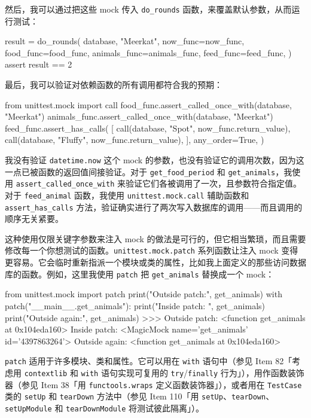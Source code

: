 然后，我可以通过把这些 mock 传入 \texttt{do\_rounds} 函数，来覆盖默认参数，从而运行测试：

\begin{codebox}[python]
result = do_rounds(
    database,
    "Meerkat",
    now_func=now_func,
    food_func=food_func,
    animals_func=animals_func,
    feed_func=feed_func,
)
assert result == 2
\end{codebox}

最后，我可以验证对依赖函数的所有调用都符合我的预期：

\begin{codebox}[python]
from unittest.mock import call
food_func.assert_called_once_with(database, "Meerkat")
animals_func.assert_called_once_with(database, "Meerkat")
feed_func.assert_has_calls(
    [
        call(database, "Spot", now_func.return_value),
        call(database, "Fluffy", now_func.return_value),
    ],
    any_order=True,
)
\end{codebox}

我没有验证 \texttt{datetime.now} 这个 mock 的参数，也没有验证它的调用次数，因为这一点已被函数的返回值间接验证。对于 \texttt{get\_food\_period} 和 \texttt{get\_animals}，我使用 \texttt{assert\_called\_once\_with} 来验证它们各被调用了一次，且参数符合指定值。对于 \texttt{feed\_animal} 函数，我使用 \texttt{unittest.mock.call} 辅助函数和 \texttt{assert\_has\_calls} 方法，验证确实进行了两次写入数据库的调用——而且调用的顺序无关紧要。

这种使用仅限关键字参数来注入 mock 的做法是可行的，但它相当繁琐，而且需要修改每一个你想测试的函数。\texttt{unittest.mock.patch} 系列函数让注入 mock 变得更容易。它会临时重新指派一个模块或类的属性，比如我上面定义的那些访问数据库的函数。例如，这里我使用 \texttt{patch} 把 \texttt{get\_animals} 替换成一个 mock：

\begin{codebox}[python]
from unittest.mock import patch
print("Outside patch:", get_animals)
with patch("__main__.get_animals"):
    print("Inside patch: ", get_animals)
print("Outside again:", get_animals)
>>>
Outside patch: <function get_animals at 0x104eda160>
Inside patch:  <MagicMock name='get_animals' id='4397863264'>
Outside again: <function get_animals at 0x104eda160>
\end{codebox}

\texttt{patch} 适用于许多模块、类和属性。它可以用在 \texttt{with} 语句中（参见 Item 82「考虑用 \texttt{contextlib} 和 \texttt{with} 语句实现可复用的 \texttt{try}/\texttt{finally} 行为」），用作函数装饰器（参见 Item 38「用 \texttt{functools.wraps} 定义函数装饰器」），或者用在 \texttt{TestCase} 类的 \texttt{setUp} 和 \texttt{tearDown} 方法中（参见 Item 110「用 \texttt{setUp}、\texttt{tearDown}、\texttt{setUpModule} 和 \texttt{tearDownModule} 将测试彼此隔离」）。


